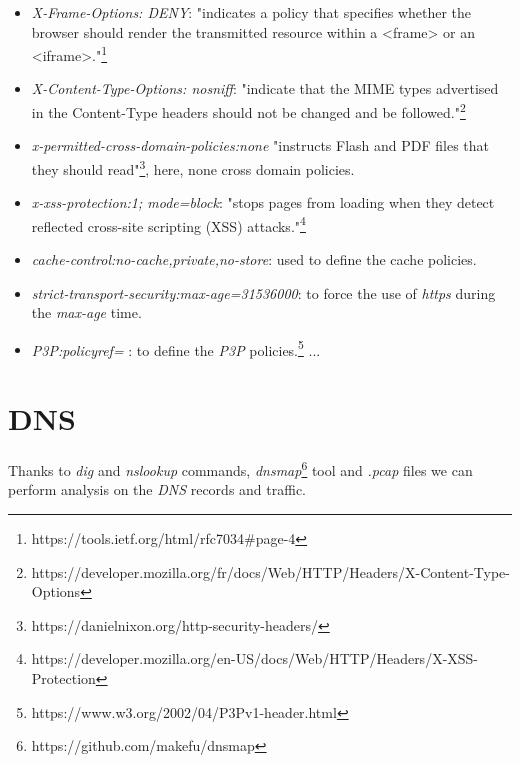 \documentclass[conference]{IEEEtran}
\begin{document}
    \begin{itemize}
        \item \textit{X-Frame-Options: DENY}: "indicates a policy that specifies whether the browser should render the transmitted resource within a <frame> or an <iframe>."\footnote{https://tools.ietf.org/html/rfc7034#page-4}
        \item \textit{X-Content-Type-Options: nosniff}: "indicate that the MIME types advertised in the Content-Type headers should not be changed and be followed."\footnote{https://developer.mozilla.org/fr/docs/Web/HTTP/Headers/X-Content-Type-Options}
        \item \textit{x-permitted-cross-domain-policies:none} "instructs Flash and PDF files that they should read"\footnote{https://danielnixon.org/http-security-headers/}, here, none cross domain policies. 
        \item \textit{x-xss-protection:1; mode=block}: "stops pages from loading when they detect reflected cross-site scripting (XSS) attacks."\footnote{https://developer.mozilla.org/en-US/docs/Web/HTTP/Headers/X-XSS-Protection} 
        \item \textit{cache-control:no-cache,private,no-store}: used to define the cache policies. 
        \item \textit{strict-transport-security:max-age=31536000}: to force the use of \textit{https} during the \textit{max-age} time.
        \item \textit{P3P:policyref= }: to define the \textit{P3P} policies.\footnote{https://www.w3.org/2002/04/P3Pv1-header.html}
        ...
    \end{itemize}



\section{DNS}
Thanks to \textit{dig} and \textit{nslookup} commands, \textit{dnsmap}\footnote{https://github.com/makefu/dnsmap} tool and \textit{.pcap} files we can perform analysis on the \textit{DNS} records and traffic.
\end{document}
